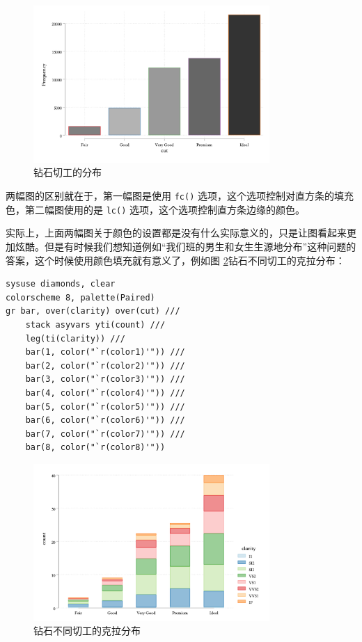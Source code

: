 \documentclass[]{ctexbook}
\begin{document}
\begin{figure}

{\centering \includegraphics[width=0.8\textwidth]{assets/barcutmulticolor2} 

}

\caption{钻石切工的分布}\label{fig:barcutmulticolor2}
\end{figure}

两幅图的区别就在于，第一幅图是使用 \texttt{fc()} 选项，这个选项控制对直方条的填充色，第二幅图使用的是 \texttt{lc()} 选项，这个选项控制直方条边缘的颜色。

实际上，上面两幅图关于颜色的设置都是没有什么实际意义的，只是让图看起来更加炫酷。但是有时候我们想知道例如``我们班的男生和女生生源地分布''这种问题的答案，这个时候使用颜色填充就有意义了，例如图 \ref{fig:stackcutclarity}钻石不同切工的克拉分布：

\begin{lstlisting}
sysuse diamonds, clear
colorscheme 8, palette(Paired)
gr bar, over(clarity) over(cut) ///
    stack asyvars yti(count) ///
    leg(ti(clarity)) ///
    bar(1, color("`r(color1)'")) ///
    bar(2, color("`r(color2)'")) ///
    bar(3, color("`r(color3)'")) ///
    bar(4, color("`r(color4)'")) ///
    bar(5, color("`r(color5)'")) ///
    bar(6, color("`r(color6)'")) ///
    bar(7, color("`r(color7)'")) ///
    bar(8, color("`r(color8)'"))
\end{lstlisting}

\begin{figure}

{\centering \includegraphics[width=0.8\textwidth]{assets/stackcutclarity} 

}

\caption{钻石不同切工的克拉分布}\label{fig:stackcutclarity}
\end{figure}
\end{document}
